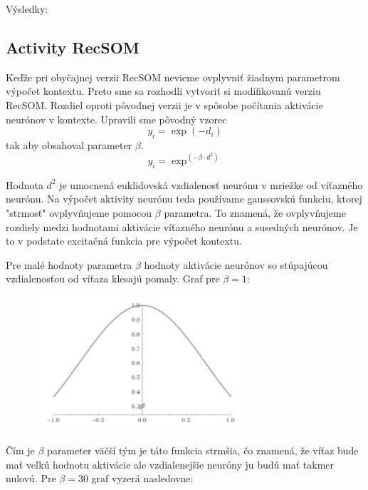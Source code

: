

Výsledky: \\


\subsection{Activity RecSOM}
Keďže pri obyčajnej verzii RecSOM nevieme ovplyvniť žiadnym parametrom výpočet kontextu. Preto sme sa 
rozhodli vytvoriť si modifikovanú verziu RecSOM. Rozdiel oproti pôvodnej verzii je v spôsobe počítania 
aktivácie neurónov v kontexte. 
Upravili sme pôvodný vzorec %
\begin{equation}
    y_{i} = \exp{(-d_{i})}
\end{equation}
tak aby obsahoval parameter $\beta$.
\begin{equation}
    y_{i} = \exp^{(-\beta \cdot d^2)}
\end{equation}

Hodnota $d^2$ je umocnená euklidovská vzdialenosť neurónu v mriežke od víťazného neurónu.
Na výpočet aktivity neurónu teda používame gaussovskú funkciu, ktorej "strmosť" ovplyvňujeme
pomocou $\beta$ parametra. To znamená, že ovplyvňujeme rozdiely medzi hodnotami aktivácie víťazného neurónu
a susedných neurónov. Je to v podstate excitačná funkcia pre výpočet kontextu.

Pre malé hodnoty parametra $\beta$ hodnoty aktivácie neurónov so stúpajúcou vzdialenosťou od víťaza
klesajú pomaly. Graf pre $\beta = 1$:

\begin{figure}[H]
    \centering
    \includegraphics[width=8cm]{assets/gaus1}
    \caption{}
\end{figure}

Čím je $\beta$ parameter väčší tým je táto funkcia strmšia, čo znamená, že víťaz bude mať veľkú hodnotu aktivácie
ale vzdialenejšie neuróny ju budú mať takmer nulovú.
Pre $\beta = 30$ graf vyzerá nasledovne:

